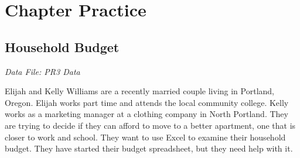 \section{Chapter Practice}

\subsection{Household Budget}

\textit{Data File: PR3 Data}

Elijah and Kelly Williams are a recently married couple living in Portland, Oregon. Elijah works part time and attends the local community college. Kelly works as a marketing manager at a clothing company in North Portland. They are trying to decide if they can afford to move to a better apartment, one that is closer to work and school. They want to use Excel to examine their household budget. They have started their budget spreadsheet, but they need help with it.

